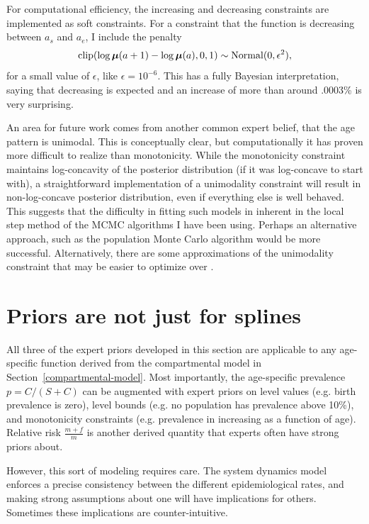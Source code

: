 For computational efficiency, the increasing and decreasing
constraints are implemented as soft constraints.  For a constraint
that the function is decreasing between $a_s$ and $a_e$, I include the penalty
\[
\operatorname{clip}(\log \boldsymbol{\mu}(a+1) - \log \boldsymbol{\mu}(a), 0, 1) \sim \operatorname{Normal}(0, \epsilon^2),
\]
for a small value of $\epsilon$, like $\epsilon = 10^{-6}$.  This has
a fully Bayesian interpretation, saying that decreasing is expected
and an increase of more than around .0003\% is very surprising.


An area for future work comes from another common expert belief, that
the age pattern is unimodal.  This is conceptually clear, but
computationally it has proven more difficult to realize than
monotonicity.  While the monotonicity constraint maintains
log-concavity of the posterior distribution (if it was log-concave to
start with), a straightforward implementation of a unimodality
constraint will result in non-log-concave posterior distribution, even
if everything else is well behaved.  This suggests that the difficulty
in fitting such models in inherent in the local step method of the
MCMC algorithms I have been using.  Perhaps an alternative approach,
such as the population Monte Carlo algorithm would be more successful.
Alternatively, there are some approximations of the unimodality
constraint that may be easier to optimize over \cite{Papp[KP6]]}.

\section{Priors are not just for splines}
All three of the expert priors developed in this section are
applicable to any age-specific function derived from the compartmental
model in Section~\ref{compartmental-model}. Most importantly, the
age-specific prevalence $p = C/(S+C)$ can be augmented with expert
priors on level values (e.g. birth prevalence is zero), level bounds
(e.g. no population has prevalence above 10\%), and monotonicity
constraints (e.g. prevalence in increasing as a function of
age). Relative risk $\frac{m+f}{m}$ is another derived quantity that
experts often have strong priors about.

However, this sort of modeling requires care. The system dynamics
model enforces a precise consistency between the different
epidemiological rates, and making strong assumptions about one will
have implications for others.  Sometimes these implications are
counter-intuitive.

